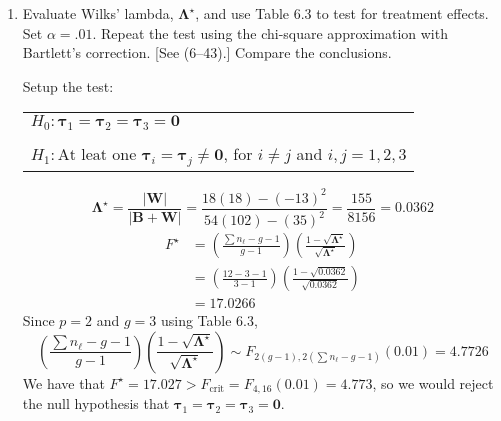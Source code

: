 \begin{enumerate}[label= (\alph*)]
    \item Evaluate Wilks' lambda, $\bm{\Lambda}^{\star}$, and use Table 6.3 to test for treatment effects.
    Set $\alpha = .01$. Repeat the test using the chi-square approximation with Bartlett's correction.
    [See (6--43).] Compare the conclusions.
    
    \par

    Setup the test:
    
        \begin{NiceTabular}{l}
            $H_{0}: \bm{\tau}_{1} = \bm{\tau}_{2} = \bm{\tau}_{3} = \textbf{0}$ \\
             \\
            $H_{1}: \text{At leat one } \bm{\tau}_{i} = \bm{\tau}_{j} \ne \textbf{0}$, for $i \ne j$ and $i,j = 1,2,3$
        \end{NiceTabular}
    

    \[
        \bm{\Lambda}^{\star}
        =
        \frac{\left|\textbf{W}\right|}{\left|\textbf{B} + \textbf{W}\right|}
        =
        \frac{18(18) - {(-13)}^{2}}{54(102) - {(35)}^{2}}
        =
        \frac{155}{8156}
        =
        0.0362
    \]
    \begin{align*}
        F^{\star}
        & =
        \left(
            \frac{\sum{n_{\ell} - g - 1}}{g - 1}
        \right)
        \left(
            \frac{1 - \sqrt{\bm{\Lambda}^{\star}}}{\sqrt{\bm{\Lambda}^{\star}}}
        \right) \\
        & =
        \left(
            \frac{12 - 3 - 1}{3 - 1}
        \right)
        \left(
            \frac{1 - \sqrt{0.0362}}{\sqrt{0.0362}}
        \right) \\
        & =
        17.0266
    \end{align*}
    Since $p = 2$ and $g = 3$ using Table 6.3,
    \[
        \left(
            \frac{\sum{n_{\ell} - g - 1}}{g - 1}
        \right)
        \left(
            \frac{1 - \sqrt{\bm{\Lambda}^{\star}}}{\sqrt{\bm{\Lambda}^{\star}}}
        \right)
        \sim
        F_{2(g-1), 2(\sum{n_{\ell} - g - 1})}(0.01)
        =
        4.7726
    \]
    We have that $F^{\star} = 17.027 > F_{\text{crit}} = F_{4,16}(0.01) = 4.773$, so we would reject the null hypothesis that $\bm{\tau}_{1} = \bm{\tau}_{2} = \bm{\tau}_{3} = \textbf{0}$.


\end{enumerate}
